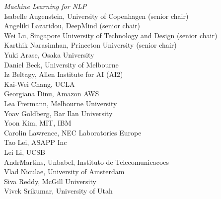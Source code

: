 \emph{Machine Learning for NLP} \\
\hspace*{0.2in} Isabelle Augenstein, University of Copenhagen (senior chair)\\
\hspace*{0.2in} Angeliki Lazaridou, DeepMind (senior chair)\\
\hspace*{0.2in} Wei Lu, Singapore University of Technology and Design (senior chair)\\
\hspace*{0.2in} Karthik Narasimhan, Princeton University (senior chair)\\
\hspace*{0.2in} Yuki Arase, Osaka University\\
\hspace*{0.2in} Daniel Beck, University of Melbourne\\
\hspace*{0.2in} Iz Beltagy, Allen Institute for AI (AI2)\\
\hspace*{0.2in} Kai-Wei Chang, UCLA\\
\hspace*{0.2in} Georgiana Dinu, Amazon AWS\\
\hspace*{0.2in} Lea Frermann, Melbourne University\\
\hspace*{0.2in} Yoav Goldberg, Bar Ilan University\\
\hspace*{0.2in} Yoon Kim, MIT, IBM\\
\hspace*{0.2in} Carolin Lawrence, NEC Laboratories Europe\\
\hspace*{0.2in} Tao Lei, ASAPP Inc\\
\hspace*{0.2in} Lei Li, UCSB\\
\hspace*{0.2in} Andr\' Martins, Unbabel, Instituto de Telecomunicacoes\\
\hspace*{0.2in} Vlad Niculae, University of Amsterdam\\
\hspace*{0.2in} Siva Reddy, McGill University\\
\hspace*{0.2in} Vivek Srikumar, University of Utah\\
